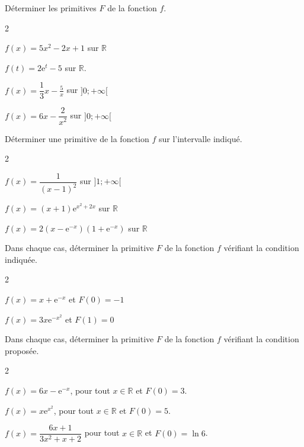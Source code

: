 \documentclass[11pt,a4paper]{article}  %
\begin{document}
\vspace*{-0.5cm}
\exerciceDS{}

Déterminer les primitives $F$ de la fonction $f$.

\begin{multicols}{2}
	\begin{enumMet}
		\item $f(x)=5 x^2-2 x+1$ sur $\mathbb{R}$
		\item $f(t)=2 \mathrm{e}^t-5$ sur $\mathbb{R}$.
		\item $f(x)=\dfrac{1}{3} x-\frac{5}{x}$ sur $] 0 ;+\infty[$
		\item $f(x)=6 x-\dfrac{2}{x^2}$ sur $] 0 ;+\infty[$
	\end{enumMet}
\end{multicols}

\vspace*{-0.5cm}
\exerciceDS{}
Déterminer une primitive de la fonction $f$ sur l'intervalle indiqué.

\begin{multicols}{2}
	\begin{enumMet}
	\item $f(x)=\dfrac{1}{(x-1)^2}$ sur $] 1 ;+\infty[$
	\item $f(x)=(x+1) \mathrm{e}^{x^2+2 x}$ sur $\mathbb{R}$
	\item $f(x)=2\left(x-\mathrm{e}^{-x}\right)\left(1+\mathrm{e}^{-x}\right)$ sur $\mathbb{R}$
\end{enumMet}
\end{multicols}


\vspace*{-0.5cm}
\exerciceDS{}

Dans chaque cas, déterminer la primitive $F$ de la fonction $f$ vérifiant la condition indiquée.
\begin{multicols}{2}
	\begin{enumMet}
	\item $f(x)=x+\mathrm{e}^{-x}$ et $F(0)=-1$
	\item $f(x)=3 x \mathrm{e}^{-x^2}$ et $F(1)=0$
\end{enumMet}
\end{multicols}

\vspace*{-0.5cm}
\exerciceDS{}

Dans chaque cas, déterminer la primitive $F$ de la fonction $f$ vérifiant la condition proposée.
\begin{multicols}{2}
	\begin{enumMet}
		\item $f(x)=6 x-\mathrm{e}^{-x}$, pour tout $x \in \mathbb{R}$ et $F(0)=3$.
		\item $f(x)=x \mathrm{e}^{x^2}$, pour tout $x \in \mathbb{R}$ et $F(0)=5$.
		\item $f(x)=\dfrac{6 x+1}{3 x^2+x+2}$ pour tout $x \in \mathbb{R}$ et $F(0)=\ln 6$.
	\end{enumMet}
\end{multicols}
\end{document}
